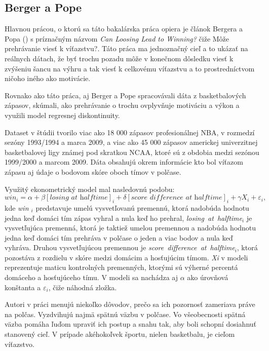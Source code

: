 \documentclass[
  digital, %
  oneside, %
  notable,   %
  lof,     %
  lot,     %
]{fithesis3}
\begin{document}
		\subsection{Berger a Pope}
		\label{sec:Berger}
		Hlavnou prácou, o ktorú sa táto bakalárska práca opiera je článok Bergera a Popa (\citeyear{berger2011}) s príznačným názvom \textit{Can Loosing Lead to Winning?} čiže Môže prehrávanie viesť k víťazstvu?. Táto práca ma jednoznačný cieľ a to ukázať na reálnych dátach, že byť trochu pozadu môže v konečnom dôsledku viesť k zvýšeniu šancu na výhru a tak viesť k celkovému víťazstvu a to prostredníctvom ničoho iného ako motivácie.
		
		Rovnako ako táto práca, aj Berger a Pope spracovávali dáta z basketbalových zápasov, skúmali, ako prehrávanie o trochu ovplyvňuje motiváciu a výkon a využili model regresnej diskontinuity. 
		
		Dataset v štúdii tvorilo viac ako 18 000 zápasov profesionálnej NBA, v rozmedzí sezóny 1993/1994 a marca 2009, a viac ako 45 000 zápasov americkej univerzitnej basketbalovej ligy známej pod skratkou NCAA, ktoré sú z obdobia medzi sezónou 1999/2000 a marcom 2009. \parencite[s.~818]{berger2011} Dáta obsahujú okrem informácie kto bol víťazom zápasu aj údaje o bodovom skóre oboch tímov v polčase.
		
		Využitý ekonometrický model mal nasledovnú podobu:
		\begin{equation}
		win_{i} = \alpha + \beta [\textit{losing~at~halftime}]_{i} + \delta [\textit{score~difference~at~halftime}]_{i} + \gamma X_{i} + \varepsilon_{i},
		\end{equation}
		kde \textit{ win $ _{i} $} predstavuje umelú vysvetľovanú premennú, ktorá nadobúda hodnotu jedna keď domáci tím zápas vyhral a nula keď ho prehral, \textit{losing~at~halftime$ _{i} $} je vysvetľujúca premenná, ktorá je taktiež umelou premennou a nadobúda hodnotu jedna keď domáci tím prehráva v polčase o jeden a viac bodov a nula keď vyhráva. Druhou vysvetľujúcou premennou je \textit{score~difference~at~halftime$ _{i} $}, ktorá pozostáva z rozdielu v skóre medzi domácim a hosťujúcim tímom. \textit{Xi} v modeli reprezentuje maticu kontrolných premenných, ktorými sú výherné percentá domáceho a hosťujúceho tímu.  V modeli sa nachádza aj $\alpha$ ako úrovňová konštanta a $\varepsilon_{i}$, čiže náhodná zložka.
		
		Autori v práci menujú niekoľko dôvodov, prečo sa ich pozornosť zameriava práve na polčas. Vyzdvihujú najmä spätnú väzbu v polčase. Vo všeobecnosti spätná väzba pomáha ľuďom upraviť ich postup a snahu tak, aby boli schopní dosiahnuť stanovený cieľ. \parencite{locke2002} V prípade akéhokoľvek športu, nielen basketbalu, je cieľom víťazstvo.
		
\end{document}
